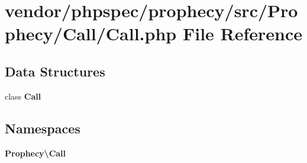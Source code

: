 \section{vendor/phpspec/prophecy/src/\+Prophecy/\+Call/\+Call.php File Reference}
\label{_call_8php}
\subsection*{Data Structures}
\begin{DoxyCompactItemize}
\item 
class {\bf Call}
\end{DoxyCompactItemize}
\subsection*{Namespaces}
\begin{DoxyCompactItemize}
\item 
 {\bf Prophecy\textbackslash{}\+Call}
\end{DoxyCompactItemize}
